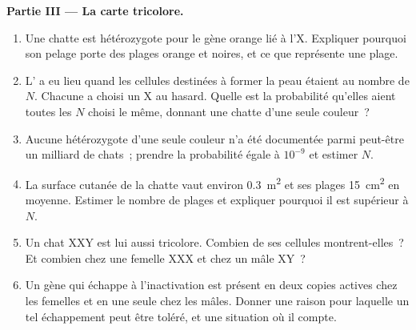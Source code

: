 \begin{problem}
\medskip
\noindent\textbf{Partie III --- La carte tricolore.}
\begin{enumerate}[resume]
  \item Une chatte est hétérozygote pour le gène orange lié à l'X.
        Expliquer pourquoi son pelage porte des plages orange et
        noires, et ce que représente une plage.
  \item L' a eu lieu quand les cellules destinées à
        former la peau étaient au nombre de $N$. Chacune a choisi un X
        au hasard. Quelle est la probabilité qu'elles aient toutes les
        $N$ choisi le même, donnant une chatte d'une seule couleur~?
  \item Aucune hétérozygote d'une seule couleur n'a été documentée
        parmi peut-être un milliard de chats~; prendre la probabilité
        égale à $10^{-9}$ et estimer $N$.
  \item La surface cutanée de la chatte vaut environ \qty{0.3}{m^2} et
        ses plages \qty{15}{cm^2} en moyenne. Estimer le nombre de
        plages et expliquer pourquoi il est supérieur à $N$.
  \item Un chat XXY est lui aussi tricolore. Combien de  ses cellules montrent-elles~? Et combien chez une femelle
        XXX et chez un mâle XY~?
  \item Un gène qui échappe à l'inactivation est présent en deux copies
        actives chez les femelles et en une seule chez les mâles.
        Donner une raison pour laquelle un tel échappement peut être
        toléré, et une situation où il compte.
\end{enumerate}


\end{problem}
